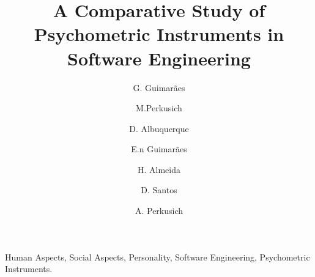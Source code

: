 \documentclass[conference]{IEEEtran}
\begin{document}
\title{A Comparative Study of Psychometric Instruments in Software Engineering}

\author[1]{G. Guimarães}
\author[1]{M.Perkusich}
\author[1]{D. Albuquerque}
\author[2] {E.n Guimarães}
\author[1]{H. Almeida}
\author[1]{D. Santos}
\author[1]{A. Perkusich}



\maketitle
\thispagestyle{doi}


\begin{IEEEkeywords}
Human Aspects, Social Aspects, Personality, Software Engineering, Psychometric Instruments.
\end{IEEEkeywords}







 


 
\end{document}
